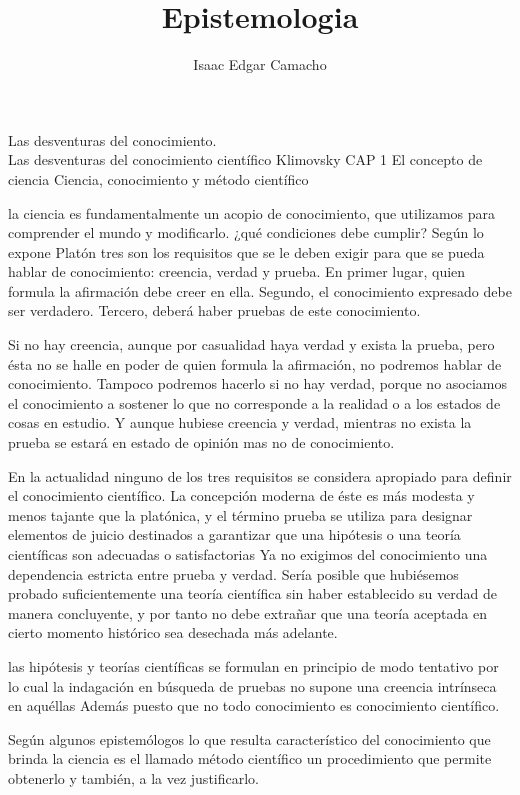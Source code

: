 \documentclass{article}
\title{Epistemologia}
\author{Isaac Edgar Camacho}
\begin{document}

\maketitle

Las desventuras del conocimiento.
\\
Las desventuras del conocimiento científico  Klimovsky CAP 1	
El concepto de ciencia
Ciencia, conocimiento y método científico

la ciencia es fundamentalmente un acopio de conocimiento, que utilizamos para comprender el mundo y modificarlo. 
¿qué condiciones debe cumplir? Según lo expone Platón tres son los requisitos que se le deben exigir para que se pueda hablar de conocimiento: creencia, verdad y prueba. En primer lugar, quien formula la afirmación debe creer en ella. Segundo, el conocimiento expresado debe ser verdadero. Tercero, deberá haber pruebas de este conocimiento.

Si no hay creencia, aunque por casualidad haya verdad y exista la prueba, pero ésta no se halle en poder de quien formula la afirmación, no podremos hablar de conocimiento. Tampoco podremos hacerlo si no hay verdad, porque no asociamos el conocimiento a sostener lo que no corresponde a la realidad o a los estados de cosas en estudio. Y aunque hubiese creencia y verdad, mientras no exista la prueba se estará en estado de opinión mas no de conocimiento.

En la actualidad ninguno de los tres requisitos se considera apropiado para definir el conocimiento científico.  La concepción moderna de éste es más modesta y menos tajante que la platónica, y el término prueba se utiliza para designar elementos de juicio destinados a garantizar que una hipótesis o una teoría científicas son adecuadas o satisfactorias  Ya no exigimos del conocimiento una dependencia estricta entre prueba y verdad. Sería posible que hubiésemos probado suficientemente una teoría científica sin haber establecido su verdad de manera concluyente, y por tanto no debe extrañar que una teoría aceptada en cierto momento histórico sea desechada más adelante.

las hipótesis y teorías científicas se formulan en principio de modo tentativo por lo cual la indagación en búsqueda de pruebas no supone una creencia intrínseca en aquéllas Además puesto que no todo conocimiento es conocimiento científico.

Según algunos epistemólogos lo que resulta característico del conocimiento que brinda la ciencia es el llamado método científico un procedimiento que permite obtenerlo y también, a la vez justificarlo.
\end{document}
